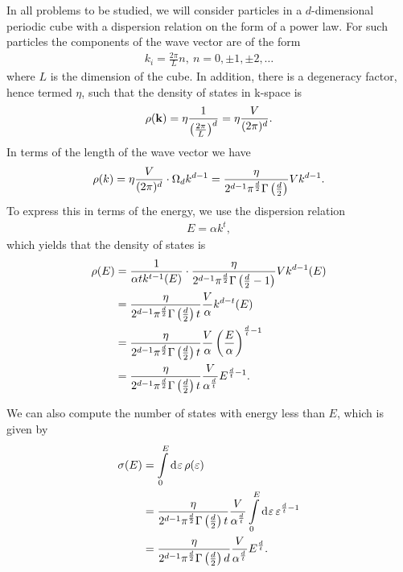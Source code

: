 In all problems to be studied, we will consider particles in a $d$-dimensional periodic cube with a dispersion relation on the form of a power law. For such particles the components of the wave vector are of the form
\begin{align*}
	k_{i} = \frac{2\pi}{L}n,\ n = 0, \pm 1, \pm 2, \dots
\end{align*}
where $L$ is the dimension of the cube. In addition, there is a degeneracy factor, hence termed $\eta$, such that the density of states in k-space is
\begin{align*}
	\rho(\vb{k}) = \eta\frac{1}{\left(\frac{2\pi}{L}\right)^{d}} = \eta\frac{V}{(2\pi)^{d}}.
\end{align*}
In terms of the length of the wave vector we have
\begin{align*}
	\rho(k) = \eta\frac{V}{(2\pi)^{d}}\cdot \Omega_{d}k^{d - 1} = \frac{\eta}{2^{d - 1}\pi^{\frac{d}{2}}\Gamma\left(\frac{d}{2}\right)}Vk^{d - 1}.
\end{align*}
To express this in terms of the energy, we use the dispersion relation
\begin{align*}
	E = \alpha k^{t},
\end{align*}
which yields that the density of states is
\begin{align*}
	\rho(E) &= \frac{1}{\alpha tk^{t - 1}(E)}\cdot \frac{\eta}{2^{d - 1}\pi^{\frac{d}{2}}\Gamma\left(\frac{d}{2} - 1\right)}Vk^{d - 1}(E) \\
	        &= \frac{\eta}{2^{d - 1}\pi^{\frac{d}{2}}\Gamma\left(\frac{d}{2}\right)t}\frac{V}{\alpha}k^{d - t}(E) \\
	        &= \frac{\eta}{2^{d - 1}\pi^{\frac{d}{2}}\Gamma\left(\frac{d}{2}\right)t}\frac{V}{\alpha}\left(\frac{E}{\alpha}\right)^{\frac{d}{t} - 1} \\
	        &= \frac{\eta}{2^{d - 1}\pi^{\frac{d}{2}}\Gamma\left(\frac{d}{2}\right)t}\frac{V}{\alpha^{\frac{d}{t}}}E^{\frac{d}{t} - 1}.
\end{align*}

We can also compute the number of states with energy less than $E$, which is given by
\begin{align*}
	\sigma(E) &= \int\limits_{0}^{E}\dd[]{\varepsilon}\rho(\varepsilon) \\
              &= \frac{\eta}{2^{d - 1}\pi^{\frac{d}{2}}\Gamma\left(\frac{d}{2}\right)t}\frac{V}{\alpha^{\frac{d}{t}}}\int\limits_{0}^{E}\dd[]{\varepsilon}\varepsilon^{\frac{d}{t} - 1} \\
              &= \frac{\eta}{2^{d - 1}\pi^{\frac{d}{2}}\Gamma\left(\frac{d}{2}\right)d}\frac{V}{\alpha^{\frac{d}{t}}}E^{\frac{d}{t}}.
\end{align*}

